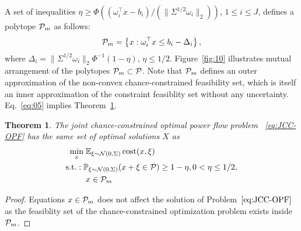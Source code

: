 \documentclass{IEEEtran4PSCC}
\newtheorem{theorem}{Theorem}[section]
\DeclareMathOperator*{\cost}{cost}
\DeclareMathOperator*{\st}{s.t.:}
\newcommand{\cP}{{\cal P}}
\newcommand{\cN}{{\cal N}}
\begin{document}
A set of inequalities $\eta \ge \Phi\left((\omega_i^\top x - b_i)/(\|\Sigma^{1/2}\omega_i\|_2)\right)$, $1\le i \le J$, defines a polytope $\cP_m$ as follows: 
\begin{align}\label{eq:05}
  \cP_m = \left\{x: \omega_i^\top x \le b_i - \Delta_i\right\},
\end{align}
where $\Delta_i = \|\Sigma^{1/2}\omega_i\|_2 \Phi^{-1}(1-\eta)$, $\eta \le 1/2$. %
Figure~\ref{fig:10} illustrates mutual arrangement of the polytopes $\cP_m \subset\cP$. Note that $\cP_m$ defines an outer approximation of the non-convex chance-constrained feasibility set, which is itself an inner approximation of the constraint feasiblity set without any uncertainty. Eq.~\eqref{eq:05} implies 
Theorem~\ref{thm:10}.
\begin{theorem}\label{thm:10}
  The joint chance-constrained optimal power flow problem~ \eqref{eq:JCC-OPF} has the same set of optimal solutions $X$ as 
  \begin{align}\label{eq:JCC-OPF-Ad}
  \min_x & \;\mathbb{E}_{\xi\sim \cN(0, \Sigma)} \cost(x,\xi)\\
   \st\; & \mathbb{P}_{\xi\sim \cN(0, \Sigma)} (x+\xi \in \cP) \ge 1 - \eta, 0 < \eta \le 1/2,\nonumber\\
   & \; x\in \cP_m\nonumber 
\end{align}
\end{theorem}
\begin{proof}
Equations $x\in\cP_m$ does not affect the solution of Problem~$\eqref{eq:JCC-OPF}$ as the feasiblity set of the chance-constrained optimization problem exists inside $\cP_m$. 
%
\end{proof}
\end{document}
